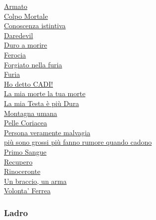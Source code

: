 \begin{multicols}{3}
{\begin{flushleft}
\hyperlink{Armato}{Armato}\\
\hyperlink{Colpo Mortale}{Colpo Mortale}\\
\hyperlink{Conoscenza istintiva}{Conoscenza istintiva}\\
\hyperlink{Daredevil}{Daredevil}\\
\hyperlink{Duro a morire}{Duro a morire}\\
\hyperlink{Ferocia}{Ferocia}\\
\hyperlink{Forgiato nella furia}{Forgiato nella furia}\\
\hyperlink{Furia}{Furia}\\
\hyperlink{Ho detto CADI!}{Ho detto CADI!}\\
\hyperlink{La mia morte la tua morte}{La mia morte la tua morte}\\
\hyperlink{La mia Testa è più Dura}{La mia Testa è più Dura}\\
\hyperlink{Montagna umana}{Montagna umana}\\
\hyperlink{Pelle Coriacea}{Pelle Coriacea}\\
\hyperlink{Persona veramente malvagia}{Persona veramente malvagia}\\
\hyperlink{più sono grossi più fanno rumore quando cadono}{più sono grossi più fanno rumore quando cadono}\\
\hyperlink{Primo Sangue}{Primo Sangue}\\
\hyperlink{Recupero}{Recupero}\\
\hyperlink{abRinoceronte}{Rinoceronte}\\
\hyperlink{Un braccio, un arma}{Un braccio, un arma}\\
\hyperlink{Volonta' Ferrea}{Volonta' Ferrea}

\titlespacing*{\subsubsection}{0pt}{0.5em}{0.5em}\subsubsection*{Ladro}


\end{flushleft}}
\end{multicols}
